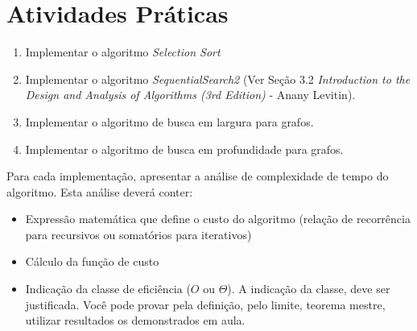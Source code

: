 \documentclass{article}
\begin{document}
\section{Atividades Práticas}

\begin{enumerate}
    \item Implementar o algoritmo \textit{Selection Sort}
    \item Implementar o algoritmo \textit{SequentialSearch2} (Ver Seção 3.2  \textit{Introduction to the Design and Analysis of Algorithms (3rd Edition)} - Anany Levitin).
    \item Implementar o algoritmo de busca em largura para grafos.
    \item Implementar o algoritmo de busca em profundidade para grafos.
    
\end{enumerate}

Para cada implementação, apresentar a análise de complexidade de tempo do algoritmo. Esta análise deverá conter:

\begin{itemize}
    \item Expressão matemática que define o custo do algoritmo (relação de recorrência para recursivos ou somatórios para iterativos) 
    \item Cálculo da função de custo
    \item Indicação da classe de eficiência ($O$ ou $\Theta$). A indicação da classe, deve ser justificada. Você pode provar pela definição, pelo limite, teorema mestre, utilizar resultados os demonstrados em aula.
\end{itemize}




%
%
\end{document}
